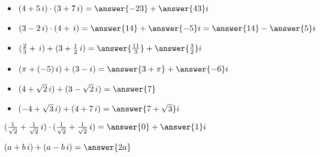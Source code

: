 \documentclass{ximera}
\begin{document}
\begin{question}


\begin{itemize}
\item   $(4 + 5 \, i) \cdot (3 + 7 \, i) = \answer{-23} + \answer{43} i$
\item   $(3 - 2 \, i) \cdot (4 + \, i) = \answer{14} + \answer{-5} i = \answer{14} - \answer{5} i$
\end{itemize}



\end{question}








\begin{question}


\begin{itemize}
\item   $(\frac{2}{3} +  \, i) + (3 + \frac{1}{2} \, i) = \answer{\frac{11}{3}} + \answer{\frac{3}{2}} i$
\item   $(\pi + (-5) \, i) + (3 - i) = \answer{3+\pi} + \answer{-6} i$
\item   $(4 + \sqrt{2} \, i) + (3 - \sqrt{2} \, i) = \answer{7}$
\item   $(-4 + \sqrt{3} \, i) + (4 + 7 \, i) = \answer{7 + \sqrt{3}} i$
\end{itemize}



\end{question}





\begin{question}


\item   $(\frac{1}{\sqrt{2}} +  \frac{1}{\sqrt{2}} \, i) \cdot (\frac{1}{\sqrt{2}} + \frac{1}{\sqrt{2}} \, i) = \answer{0} + \answer{1} i$


\end{question}










\begin{question}


\item   $(a +  b \, i) + (a - b \, i) = \answer{2a}$


\end{question}
\end{document}
